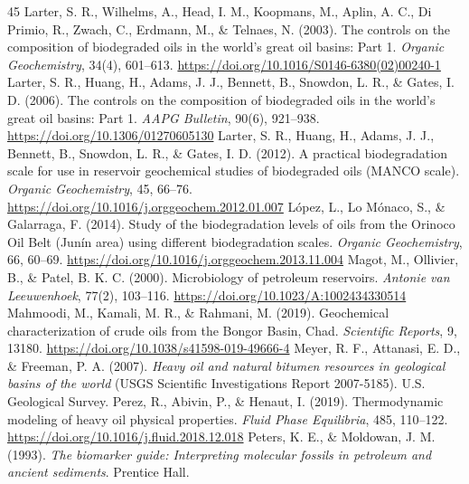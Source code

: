 \documentclass[review,12pt]{elsarticle}
\begin{document}
\begin{thebibliography}{45}
 Larter, S. R., Wilhelms, A., Head, I. M., Koopmans, M., Aplin, A. C., Di Primio, R., Zwach, C., Erdmann, M., \& Telnaes, N. (2003). The controls on the composition of biodegraded oils in the world's great oil basins: Part 1. \textit{Organic Geochemistry}, 34(4), 601--613. \url{https://doi.org/10.1016/S0146-6380(02)00240-1}
 Larter, S. R., Huang, H., Adams, J. J., Bennett, B., Snowdon, L. R., \& Gates, I. D. (2006). The controls on the composition of biodegraded oils in the world's great oil basins: Part 1. \textit{AAPG Bulletin}, 90(6), 921--938. \url{https://doi.org/10.1306/01270605130}
 Larter, S. R., Huang, H., Adams, J. J., Bennett, B., Snowdon, L. R., \& Gates, I. D. (2012). A practical biodegradation scale for use in reservoir geochemical studies of biodegraded oils (MANCO scale). \textit{Organic Geochemistry}, 45, 66--76. \url{https://doi.org/10.1016/j.orggeochem.2012.01.007}
 López, L., Lo Mónaco, S., \& Galarraga, F. (2014). Study of the biodegradation levels of oils from the Orinoco Oil Belt (Junín area) using different biodegradation scales. \textit{Organic Geochemistry}, 66, 60--69. \url{https://doi.org/10.1016/j.orggeochem.2013.11.004}
 Magot, M., Ollivier, B., \& Patel, B. K. C. (2000). Microbiology of petroleum reservoirs. \textit{Antonie van Leeuwenhoek}, 77(2), 103--116. \url{https://doi.org/10.1023/A:1002434330514}
 Mahmoodi, M., Kamali, M. R., \& Rahmani, M. (2019). Geochemical characterization of crude oils from the Bongor Basin, Chad. \textit{Scientific Reports}, 9, 13180. \url{https://doi.org/10.1038/s41598-019-49666-4}
 Meyer, R. F., Attanasi, E. D., \& Freeman, P. A. (2007). \textit{Heavy oil and natural bitumen resources in geological basins of the world} (USGS Scientific Investigations Report 2007-5185). U.S. Geological Survey.
 Perez, R., Abivin, P., \& Henaut, I. (2019). Thermodynamic modeling of heavy oil physical properties. \textit{Fluid Phase Equilibria}, 485, 110--122. \url{https://doi.org/10.1016/j.fluid.2018.12.018}
 Peters, K. E., \& Moldowan, J. M. (1993). \textit{The biomarker guide: Interpreting molecular fossils in petroleum and ancient sediments}. Prentice Hall.

\end{thebibliography}
\end{document}
